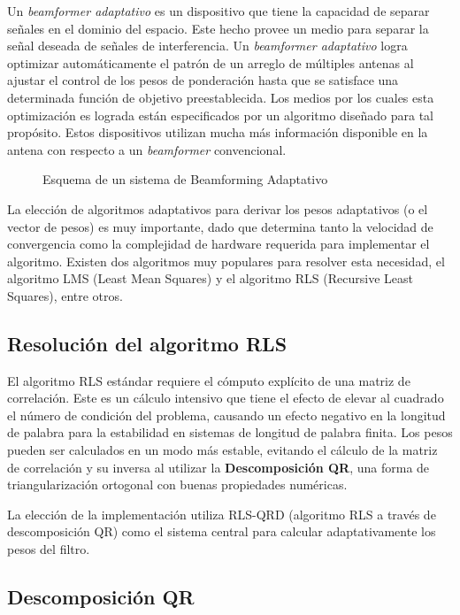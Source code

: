 \documentclass[a4paper]{article}
\begin{document}
Un \textit{beamformer adaptativo} es un dispositivo que tiene la capacidad de separar señales en el dominio del espacio. Este hecho provee un medio para separar la señal deseada de señales de interferencia. Un \textit{beamformer adaptativo} logra optimizar automáticamente el patrón de un arreglo de múltiples antenas al ajustar el control de los pesos de ponderación hasta que se satisface una determinada función de objetivo preestablecida. Los medios por los cuales esta optimización es lograda están especificados por un algoritmo diseñado para tal propósito. Estos dispositivos utilizan mucha más información disponible en la antena con respecto a un \textit{beamformer} convencional.

\begin{figure}[htb!]
        \centering
        \caption{Esquema de un sistema de Beamforming Adaptativo}
        \label{fig:Adaptive_Beamforming}
\end{figure}

La elección de algoritmos adaptativos para derivar los pesos adaptativos (o el vector de pesos) es muy importante, dado que determina tanto la velocidad de convergencia como la complejidad de hardware requerida para implementar el algoritmo. Existen dos algoritmos muy populares para resolver esta necesidad, el algoritmo LMS (Least Mean Squares) y el algoritmo RLS (Recursive Least Squares), entre otros.

\subsection{Resolución del algoritmo RLS}

El algoritmo RLS estándar requiere el cómputo explícito de una matriz de correlación. Este es un cálculo intensivo que tiene el efecto de elevar al cuadrado el número de condición del problema, causando un efecto negativo en la longitud de palabra para la estabilidad en sistemas de longitud de palabra finita. Los pesos pueden ser calculados en un modo más estable, evitando el cálculo de la matriz de correlación y su inversa al utilizar la \textbf{Descomposición QR}, una forma de triangularización ortogonal con buenas propiedades numéricas. 

La elección de la implementación utiliza RLS-QRD (algoritmo RLS a través de descomposición QR) como el sistema central para calcular adaptativamente los pesos del filtro.

\subsection{Descomposición QR}
\end{document}
